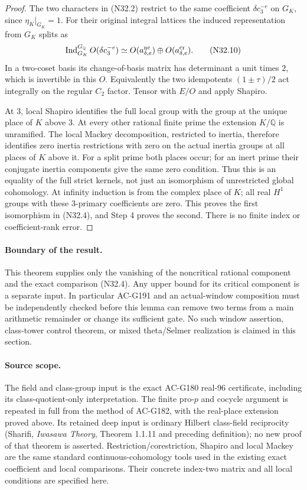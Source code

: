 \begin{proof}
The two characters in (N32.2) restrict to the same coefficient
$\delta c_3^{-e}$ on $G_K$, since $\eta_K|_{G_K}=1$.
For their original integral lattices the induced representation
from $G_K$ splits as
\[
 \operatorname{Ind}_{G_K}^{G_{\mathbb Q}}O(\delta c_3^{-e})
       \simeq O(a_{\delta,e}^{\rm nc})
                      \oplus O(a_{\delta,e}^{\rm cr}).
 \tag{N32.10}
\]
In a two-coset basis its change-of-basis matrix has determinant
a unit times $2$, which is invertible in this $O$.
Equivalently the two idempotents $(1\pm\tau)/2$ act integrally
on the regular $C_2$ factor.  Tensor with $E/O$ and apply Shapiro.

At $3$, local Shapiro identifies the full local group with the
group at the unique place of $K$ above $3$.
At every other rational finite prime the extension $K/\mathbb Q$
is unramified.  The local Mackey decomposition, restricted to
inertia, therefore identifies zero inertia restrictions with
zero on the actual inertia groups at all places of $K$ above it.
For a split prime both places occur; for an inert prime their
conjugate inertia components give the same zero condition.
Thus this is an equality of the full strict kernels, not just
an isomorphism of unrestricted global cohomology.
At infinity induction is from the complex place of $K$;
all real $H^1$ groups with these $3$-primary coefficients are zero.
This proves the first isomorphism in (N32.4), and Step 4 proves
the second.  There is no finite index or coefficient-rank error.
\end{proof}

\paragraph{Boundary of the result.}
This theorem supplies only the vanishing of the noncritical
rational component and the exact comparison (N32.4).
Any upper bound for its critical component is a separate input.
In particular AC-G191 and an actual-window composition must be
independently checked before this lemma can remove two terms
from a main arithmetic remainder or change its sufficient gate.
No such window assertion, class-tower control theorem, or mixed
theta/Selmer realization is claimed in this section.

\paragraph{Source scope.}
The field and class-group input is the exact AC-G180 real-$96$
certificate, including its class-quotient-only interpretation.
The finite pro-$p$ and cocycle argument is repeated in full from
the method of AC-G182, with the real-place extension proved above.
Its retained deep input is ordinary Hilbert class-field reciprocity
(Sharifi, \emph{Iwasawa Theory}, Theorem 1.1.11 and preceding
definition); no new proof of that theorem is asserted.
Restriction/corestriction, Shapiro and local Mackey are the same
standard continuous-cohomology tools used in the existing exact
coefficient and local comparisons.  Their concrete index-two
matrix and all local conditions are specified here.
